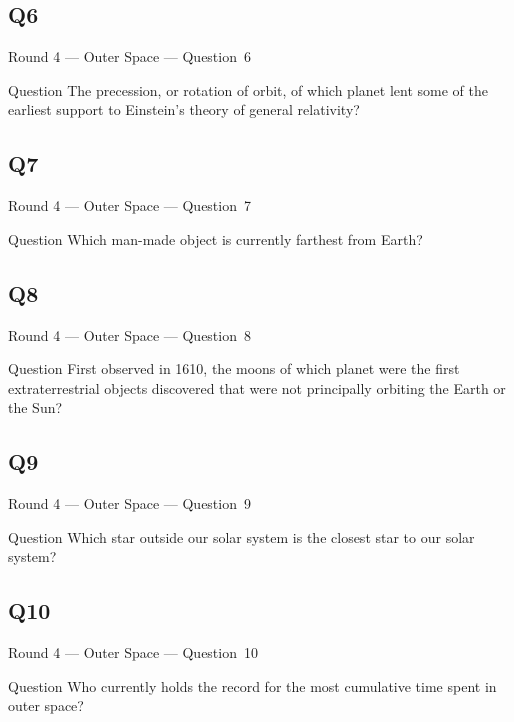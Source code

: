 \documentclass[11pt]{beamer}
\begin{document}
\subsection*{Q6}
\begin{frame}[t]{Round 4 --- Outer Space --- \mbox{Question 6}}
\vspace{-0.5em}
\begin{block}{Question}
The precession, or rotation of orbit, of which planet lent some of the earliest support to Einstein's theory of general relativity?
\end{block}
\end{frame}
\subsection*{Q7}
\begin{frame}[t]{Round 4 --- Outer Space --- \mbox{Question 7}}
\vspace{-0.5em}
\begin{block}{Question}
Which man-made object is currently farthest from Earth?
\end{block}
\end{frame}
\subsection*{Q8}
\begin{frame}[t]{Round 4 --- Outer Space --- \mbox{Question 8}}
\vspace{-0.5em}
\begin{block}{Question}
First observed in 1610, the moons of which planet were the first extraterrestrial objects discovered that were not principally orbiting the Earth or the Sun?
\end{block}
\end{frame}
\subsection*{Q9}
\begin{frame}[t]{Round 4 --- Outer Space --- \mbox{Question 9}}
\vspace{-0.5em}
\begin{block}{Question}
Which star outside our solar system is the closest star to our solar system?
\end{block}
\end{frame}
\subsection*{Q10}
\begin{frame}[t]{Round 4 --- Outer Space --- \mbox{Question 10}}
\vspace{-0.5em}
\begin{block}{Question}
Who currently holds the record for the most cumulative time spent in outer space?
\end{block}
\end{frame}
\end{document}

